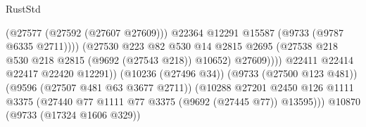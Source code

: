 \begin{lexlean}{RustStd}
\begin{coremodule}
{\begin{coremodule}
{{{{{{{{{{{{{{{{{{{{{{{{{{{{{{{{{{{{{{{{{{{{{{{{{{{{{{{                                                          (@27577 (@27592 (@27607 @27609)))
                                                          @22364
                                                          @12291
                                                          @15587
                                                          (@9733 (@9787 @6335 @2711))))
                                                      (@27530
                                                        @223
                                                        @82
                                                        @530
                                                        @14
                                                        @2815
                                                        @2695
                                                        (@27538
                                                          @218
                                                          @530
                                                          @218
                                                          @2815
                                                          (@9692 (@27543 @218))
                                                          @10652)
                                                        @27609))))
                                                @22411
                                                @22414
                                                @22417
                                                @22420
                                                @12291))
                                            (@10236 (@27496 @34))
                                            (@9733 (@27500 @123 @481))
                                            (@9596 (@27507 @481 @63 @3677 @2711))
                                            (@10288
                                              @27201
                                              @2450
                                              @126
                                              @1111
                                              @3375
                                              (@27440
                                                @77
                                                @1111
                                                @77
                                                @3375
                                                (@9692 (@27445 @77))
                                                @13595)))
                                          @10870
                                          (@9733 (@17324 @1606 @329))
}}}}}}}}}}}}}}}}}}}}}}}}}}}}}}}}}}}}}}}}}}}}}}}}}}}}}}}
\end{coremodule}}
\end{coremodule}
\end{lexlean}
